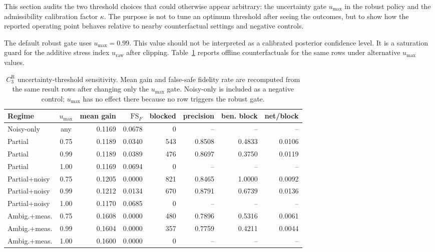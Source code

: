 \documentclass[11pt]{article}
\numberwithin{equation}{section}
\begin{document}
This section audits the two threshold choices that could otherwise appear
arbitrary: the uncertainty gate $u_{\max}$ in the robust policy and the
admissibility calibration factor $\kappa$. The purpose is not to tune an optimum
threshold after seeing the outcomes, but to show how the reported operating point
behaves relative to nearby counterfactual settings and negative controls.

The default robust gate uses $u_{\max}=0.99$. This value should not be interpreted
as a calibrated posterior confidence level. It is a saturation guard for the
additive stress index $u_{\mathrm{raw}}$ after clipping. Table~\ref{tab:umax-sens}
reports offline counterfactuals for the same rows under alternative
$u_{\max}$ values.

\begin{table}[ht]
\centering
\scriptsize
\setlength{\tabcolsep}{3pt}
\caption{$C_3^{\mathrm R}$ uncertainty-threshold sensitivity. Mean gain and false-safe fidelity
rate are recomputed from the same result rows after changing only the
$u_{\max}$ gate. Noisy-only is included as a negative control; $u_{\max}$ has no
effect there because no row triggers the robust gate.}
\label{tab:umax-sens}
\begin{tabular}{@{}lcrrrrrr@{}}
\toprule
Regime & $u_{\max}$ & mean gain & $\mathrm{FS}_F$ & blocked &
precision & ben. block & net/block \\
\midrule
Noisy-only & any & 0.1169 & 0.0678 & 0 & -- & -- & -- \\
\midrule
Partial & 0.75 & 0.1189 & 0.0340 & 543 & 0.8508 & 0.4833 & 0.0106 \\
Partial & 0.99 & 0.1189 & 0.0389 & 476 & 0.8697 & 0.3750 & 0.0119 \\
Partial & 1.00 & 0.1169 & 0.0694 & 0 & -- & -- & -- \\
Partial+noisy & 0.75 & 0.1205 & 0.0000 & 821 & 0.8465 & 1.0000 & 0.0092 \\
Partial+noisy & 0.99 & 0.1212 & 0.0134 & 670 & 0.8791 & 0.6739 & 0.0136 \\
Partial+noisy & 1.00 & 0.1170 & 0.0685 & 0 & -- & -- & -- \\
Ambig.+meas. & 0.75 & 0.1608 & 0.0000 & 480 & 0.7896 & 0.5316 & 0.0061 \\
Ambig.+meas. & 0.99 & 0.1604 & 0.0000 & 357 & 0.7759 & 0.4211 & 0.0044 \\
Ambig.+meas. & 1.00 & 0.1600 & 0.0000 & 0 & -- & -- & -- \\
\bottomrule
\end{tabular}
\end{table}
\end{document}
